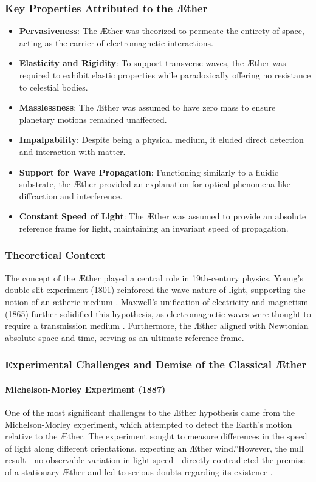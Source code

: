 \documentclass[a4paper,10pt]{article}
\begin{document}
    \subsubsection*{Key Properties Attributed to the Æther}
    \begin{itemize}
        \item \textbf{Pervasiveness}: The Æther was theorized to permeate the entirety of space, acting as the carrier of electromagnetic interactions.
        \item \textbf{Elasticity and Rigidity}: To support transverse waves, the Æther was required to exhibit elastic properties while paradoxically offering no resistance to celestial bodies.
        \item \textbf{Masslessness}: The Æther was assumed to have zero mass to ensure planetary motions remained unaffected.
        \item \textbf{Impalpability}: Despite being a physical medium, it eluded direct detection and interaction with matter.
        \item \textbf{Support for Wave Propagation}: Functioning similarly to a fluidic substrate, the Æther provided an explanation for optical phenomena like diffraction and interference.
        \item \textbf{Constant Speed of Light}: The Æther was assumed to provide an absolute reference frame for light, maintaining an invariant speed of propagation.
    \end{itemize}

    \subsubsection*{Theoretical Context}
    The concept of the Æther played a central role in 19th-century physics. Young's double-slit experiment (1801) reinforced the wave nature of light, supporting the notion of an ætheric medium \cite{young1801}. Maxwell's unification of electricity and magnetism (1865) further solidified this hypothesis, as electromagnetic waves were thought to require a transmission medium \cite{maxwell1865}. Furthermore, the Æther aligned with Newtonian absolute space and time, serving as an ultimate reference frame.

    \subsubsection*{Experimental Challenges and Demise of the Classical Æther}
    \paragraph*{Michelson-Morley Experiment (1887)}
    One of the most significant challenges to the Æther hypothesis came from the Michelson-Morley experiment, which attempted to detect the Earth's motion relative to the Æther. The experiment sought to measure differences in the speed of light along different orientations, expecting an \grqq Æther wind.\textquotedblright However, the null result—no observable variation in light speed—directly contradicted the premise of a stationary Æther and led to serious doubts regarding its existence \cite{michelson1887}.
\end{document}
